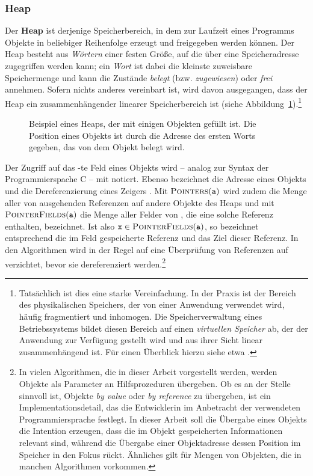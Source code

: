 \subsubsection*{Heap}
Der \textbf{Heap} ist derjenige Speicherbereich, in dem zur Laufzeit eines Programms Objekte in beliebiger Reihenfolge erzeugt und freigegeben werden können.
Der Heap besteht aus \textit{Wörtern} einer festen Größe, auf die über eine Speicheradresse zugegriffen werden kann; ein \textit{Wort} ist dabei die kleinste zuweisbare Speichermenge und kann die Zustände \textit{belegt} (bzw. \textit{zugewiesen}) oder \textit{frei} annehmen.
Sofern nichts anderes vereinbart ist, wird davon ausgegangen, dass der Heap ein zusammenhängender linearer Speicherbereich ist (siehe Abbildung~\ref{fig:heap}).\footnote{Tatsächlich ist dies eine starke Vereinfachung.
In der Praxis ist der Bereich des physikalischen Speichers, der von einer Anwendung verwendet wird, häufig fragmentiert und inhomogen.
Die Speicherverwaltung eines Betriebssystems bildet diesen Bereich auf einen \textit{virtuellen Speicher} ab, der der Anwendung zur Verfügung gestellt wird und aus ihrer Sicht linear zusammenhängend ist.
Für einen Überblick hierzu siehe etwa \cite[Kap. 3.3]{tanenbaum}.}

\begin{figure}[h]
	\centering
	
	\caption[Beispiel eines Heaps mit Objekten]{Beispiel eines Heaps, der mit einigen Objekten gefüllt ist. Die Position eines Objekts ist durch die Adresse des ersten Worts gegeben, das von dem Objekt belegt wird.}
	\label{fig:heap}
\end{figure}

Der Zugriff auf das -te Feld eines Objekts  wird -- analog zur Syntax der Programmierspache C -- mit  notiert.
Ebenso bezeichnet  die Adresse eines Objekts und  die Dereferenzierung eines Zeigers .
Mit $\textsc{Pointers}(\texttt{a})$ wird zudem die Menge aller von  ausgehenden Referenzen auf andere Objekte des Heaps und mit $\textsc{PointerFields}(\texttt{a})$ die Menge aller Felder von , die eine solche Referenz enthalten, bezeichnet.
Ist also $\texttt{x} \in \textsc{PointerFields}(\texttt{a})$, so bezeichnet  entsprechend die im Feld gespeicherte Referenz und  das Ziel dieser Referenz.
In den Algorithmen wird in der Regel auf eine Überprüfung von Referenzen auf \Null verzichtet, bevor sie dereferenziert werden.\footnote{In vielen Algorithmen, die in dieser Arbeit vorgestellt werden, werden Objekte als Parameter an Hilfsprozeduren übergeben.
Ob es an der Stelle sinnvoll ist, Objekte \textit{by value} oder \textit{by reference} zu übergeben, ist ein Implementationsdetail, das die Entwicklerin im Anbetracht der verwendeten Programmiersprache festlegt.
In dieser Arbeit soll die Übergabe eines Objekts die Intention erzeugen, dass die im Objekt gespeicherten Informationen relevant sind, während die Übergabe einer Objektadresse dessen Position im Speicher in den Fokus rückt.
Ähnliches gilt für Mengen von Objekten, die in manchen Algorithmen vorkommen.}

